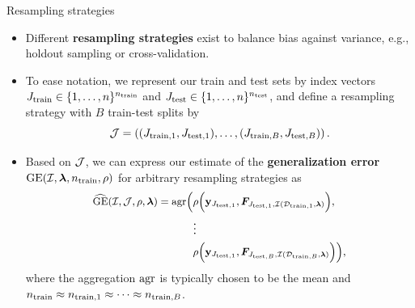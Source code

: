 \documentclass[11pt,compress,t,notes=noshow, xcolor=table]{beamer}
\begin{document}

\begin{vbframe}{Resampling strategies}
\footnotesize
\begin{itemize}
  \item Different \textbf{resampling strategies} exist to balance bias against 
  variance, e.g., holdout sampling or cross-validation.
  \item To ease notation, we represent our train and test sets by index
  vectors $\Jtrain \in \nset^{\ntrain}$ and $\Jtest
  \in \nset^{\ntest}$, and define a resampling strategy with 
  $B$ train-test splits by $$\JJ = \JJset.$$
  \item Based on $\JJ$, we can express our estimate of the \textbf{generalization error} 
 $\GEfull$ for arbitrary resampling strategies as
\begin{equation*}
\small
\begin{split}
\GEhresa = \agr\Big(
 &\rho\Big(\yv_{\Jtesti[1]}, \FJtestftraini[1]\Big), \\ &\large{\vdots} \\
& \rho\Big(\yv_{\Jtesti[1]}, \FJtestftraini[B]\Big)
    \Big),
\end{split}
\end{equation*}
  where the aggregation \textcolor{blue}{$\agr$} is typically chosen to 
  be the mean and $\ntrain \approx \ntraini[1] \approx \dots \approx \ntraini[B]$.
\end{itemize}

\end{vbframe}

\end{document}
